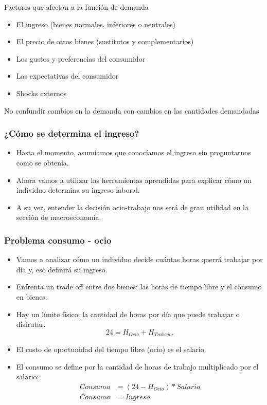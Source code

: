 \documentclass{beamer}
\begin{document}
\begin{frame}{Factores que afectan a la función de demanda}
  \begin{itemize}
    \item El ingreso (bienes normales, inferiores o neutrales)
    \item El precio de otros bienes (sustitutos y complementarios)
    \item Los gustos y preferencias del consumidor
    \item Las expectativas del consumidor
    \item Shocks externos
  \end{itemize}
  \begin{boxA}
    \begin{center}
      No confundir cambios en la demanda con cambios en las cantidades demandadas
    \end{center}
  \end{boxA}
\end{frame}

\begin{frame}
\frametitle{¿Cómo se determina el ingreso?}
\begin{itemize}
    \item Hasta el momento, asumíamos que  conocíamos el ingreso sin preguntarnos como se obtenía. 
    \item Ahora vamos a utilizar las herramientas aprendidas para explicar cómo un individuo determina su ingreso laboral.
    \item A su vez, entender la decisión ocio-trabajo nos será de gran utilidad en la sección de macroeconomía. 
\end{itemize}
\end{frame}


\begin{frame}
\frametitle{Problema consumo - ocio}
\begin{itemize}
    \item Vamos a analizar cómo un individuo decide cuántas horas querrá trabajar por día y, eso definirá su ingreso.
    \item Enfrenta un trade off entre dos bienes: las horas de tiempo libre y el consumo en bienes.
    \item Hay un límite físico: la cantidad de horas por día que puede trabajar o disfrutar.
    \begin{equation}
      24 = H_{Ocio} + H_{Trabajo}.
    \end{equation}
    \item El costo de oportunidad del tiempo libre (ocio) es el salario. 
    \item El consumo se define por la cantidad de horas de trabajo multiplicado por el salario:
    \begin{align*}
      Consumo &= (24-H_{Ocio}) * Salario \\
      Consumo &= Ingreso 
    \end{align*}
\end{itemize}
\end{frame}
\end{document}
